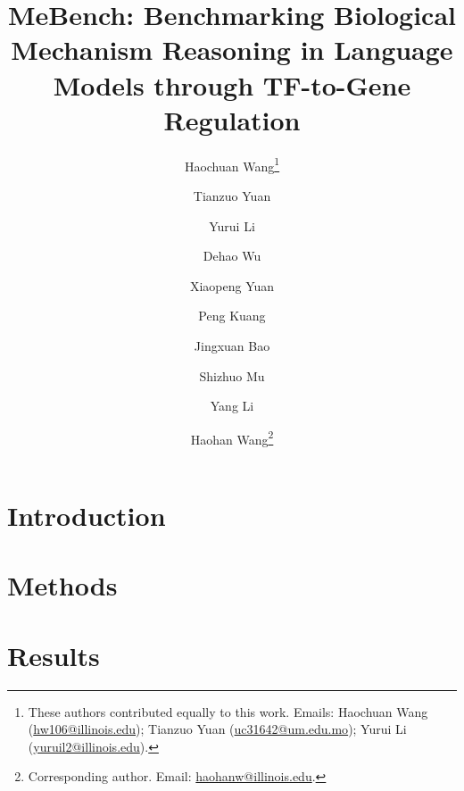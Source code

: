 \documentclass[11pt,letterpaper]{article}
\begin{document}
\thispagestyle{empty}

\title{MeBench: Benchmarking Biological Mechanism Reasoning in Language Models through TF-to-Gene Regulation}
\setcounter{Maxaffil}{2}
\author[1]{Haochuan Wang\thanks{%
These authors contributed equally to this work. Emails:
Haochuan Wang (\href{mailto:hw106@illinois.edu}{hw106@illinois.edu});
Tianzuo Yuan (\href{mailto:uc31642@um.edu.mo}{uc31642@um.edu.mo});
Yurui Li (\href{mailto:yuruil2@illinois.edu}{yuruil2@illinois.edu}).
}}

\author[2]{Tianzuo Yuan\protect\footnotemark[1]}
\author[1]{Yurui Li\protect\footnotemark[1]}
\author[1]{Dehao Wu}

\author[1]{Xiaopeng Yuan}
\author[1]{Peng Kuang}
\author[4]{Jingxuan Bao}
\author[5]{Shizhuo Mu}
\author[3]{Yang Li}
\author[1]{Haohan Wang\thanks{Corresponding author. Email: \href{mailto:haohanw@illinois.edu}{haohanw@illinois.edu}.}}
\date{}

\maketitle

\begin{abstract}
  
\end{abstract}

\clearpage
\section{Introduction}
  
   
\section{Methods}
  
\section{Results}
  
\FloatBarrier
\end{document}
